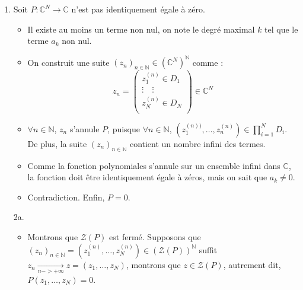 \begin{solution}
  \begin{enumerate}

      \item Soit $P : \mathbb{C} ^{N} \to \mathbb{C}$ n'est pas identiquement égale à zéro. 

        \begin{itemize}

            \item Il existe au moins un terme non nul, on note le degré maximal $k$ tel que le terme $a_k$ non nul. 

            \item On construit une suite $(z_n)_{n \in \mathbb{N}} \in (\mathbb{C} ^{N}) ^{\mathbb{N}}$ comme : 
              \begin{equation} z_n = 
                \begin{pmatrix}
                  z_1 ^{(n)} \in D_1 \\ 
                  \vdots \quad \vdots\\
                  
                  z_N ^{(n)} \in D_N \\ 
                \end{pmatrix} \in \mathbb{C} ^{N}
              \end{equation}

            \item $\forall n \in \mathbb{N}$, $z_n$ s'annule $P$, puisque $\forall n \in \mathbb{N}$, $(z_1 ^{(n))}, \dots, z_n ^{(n)} )\in \prod_{i=1}^{N} D_i$. De plus, la suite $(z_n)_{n \in \mathbb{N}}$ contient un nombre infini des termes.

            \item Comme la fonction polynomiales s'annule sur un ensemble infini dans $\mathbb{C}$, la fonction doit être identiquement égale à zéros, mais on sait que $a_k \ne 0$. 

            \item Contradiction. Enfin, $P= 0$. 


        \end{itemize}
        
      \item[2a.] 
        \begin{itemize}

            \item Montrons que $\mathcal{Z}(P)$ est fermé. Supposons que $(z_n) _{n \in \mathbb{N}} = (z_1 ^{(n)}, \dots, z_N^{(n)} )\in (\mathcal{Z}(P)) ^{\mathbb{N}}$ suffit $z_n  \underset{n -> + \infty}{\longrightarrow} z = (z_1, \dots, z_N)$, montrons que $z \in \mathcal{Z}(P)$, autrement dit, $P(z_1, \dots, z_N) = 0$. 


\end{itemize}
\end{enumerate}
\end{solution}

